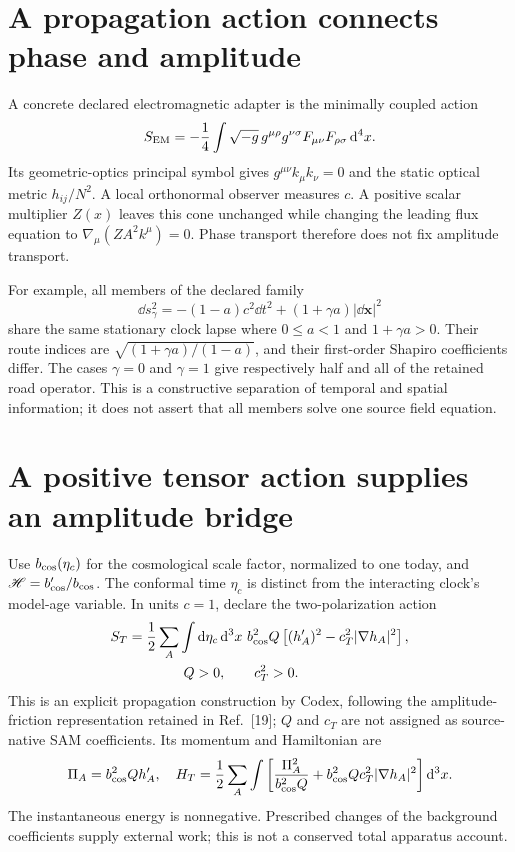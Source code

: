 \section{A propagation action connects phase and amplitude}
A concrete declared electromagnetic adapter is the minimally coupled action
\[
 S_{\rm EM}=-\frac14\int\sqrt{-g}\,g^{\mu\rho}g^{\nu\sigma}
 F_{\mu\nu}F_{\rho\sigma}\,\mathrm{d}^4x.
\]
Its geometric-optics principal symbol gives $g^{\mu\nu}k_\mu k_\nu=0$ and the static optical metric $h_{ij}/N^2$. A local orthonormal observer measures $c$. A positive scalar multiplier $Z(x)$ leaves this cone unchanged while changing the leading flux equation to $\nabla_\mu(ZA^2k^\mu)=0$. Phase transport therefore does not fix amplitude transport.

For example, all members of the declared family
\[
 \dd s_\gamma^2=-(1-a)c^2\dd t^2+(1+\gamma a)|\dd\bm x|^2
\]
share the same stationary clock lapse where $0\le a<1$ and $1+\gamma a>0$. Their route indices are $\sqrt{(1+\gamma a)/(1-a)}$, and their first-order Shapiro coefficients differ. The cases $\gamma=0$ and $\gamma=1$ give respectively half and all of the retained road operator. This is a constructive separation of temporal and spatial information; it does not assert that all members solve one source field equation.

\section{A positive tensor action supplies an amplitude bridge}
Use $b_{\rm cos}(\eta_c)$ for the cosmological scale factor, normalized to one today, and $\mathscr H=b_{\rm cos}'/b_{\rm cos}$. The conformal time $\eta_c$ is distinct from the interacting clock's model-age variable. In units $c=1$, declare the two-polarization action
\[
\begin{aligned}
 S_T&=\frac12\sum_A\int\mathrm{d}\eta_c\,\mathrm{d}^3x\ b_{\rm cos}^2Q
 \left[(h_A')^2-c_T^2|\nabla h_A|^2\right],\\
 &\hspace{4em}Q>0,\qquad c_T^2>0.
\end{aligned}
\]
This is an explicit propagation construction by Codex, following the amplitude-friction representation retained in Ref.~[19]; $Q$ and $c_T$ are not assigned as source-native SAM coefficients. Its momentum and Hamiltonian are
\[
 \Pi_A=b_{\rm cos}^2Qh_A',\quad
 H_T=\frac12\sum_A\int\left[
 \frac{\Pi_A^2}{b_{\rm cos}^2Q}+b_{\rm cos}^2Qc_T^2|\nabla h_A|^2
 \right]\mathrm{d}^3x.
\]
The instantaneous energy is nonnegative. Prescribed changes of the background coefficients supply external work; this is not a conserved total apparatus account.

